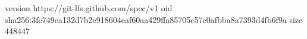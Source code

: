 version https://git-lfs.github.com/spec/v1
oid sha256:3fc749ea132d7b2e918604eaf60aa429ffa85705c57c0afbba8a7393d4fb6f9a
size 448447

